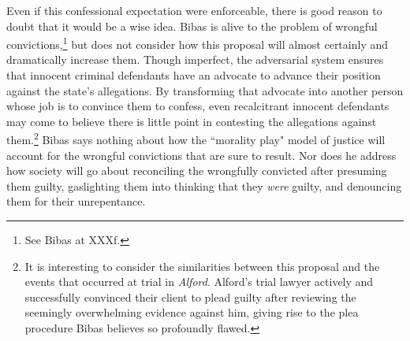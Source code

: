 Even if this confessional expectation were enforceable, there is good reason to doubt that it would be a wise idea. Bibas is alive to the problem of wrongful convictions,\footnote{See Bibas at XXXf.} but does not consider how this proposal will almost certainly and dramatically increase them. Though imperfect, the adversarial system ensures that innocent criminal defendants have an advocate to advance their position against the state's allegations. By transforming that advocate into another person whose job is to convince them to confess, even recalcitrant innocent defendants may come to believe there is little point in contesting the allegations against them.\footnote{It is interesting to consider the similarities between this proposal and the events that occurred at trial in \textit{Alford}. Alford's trial lawyer actively and successfully convinced their client to plead guilty after reviewing the seemingly overwhelming evidence against him, giving rise to the plea procedure Bibas believes so profoundly flawed.} Bibas says nothing about how the ``morality play" model of justice will account for the wrongful convictions that are sure to result. Nor does he address how society will go about reconciling the wrongfully convicted after presuming them guilty, gaslighting them into thinking that they \textit{were} guilty, and denouncing them for their unrepentance. 